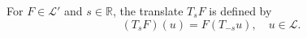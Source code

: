 For $F \in \mathcal{L}'$ and $s \in \mathbb{R}$, the translate $T_s F$ is defined by
$$(T_s F)(u) = F(T_{-s} u), \quad u \in \mathcal{L}.$$
